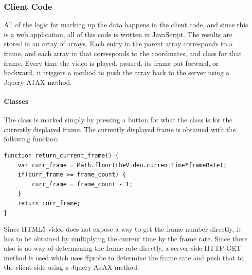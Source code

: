         \subsubsection{Client Code}
        All of the logic for marking up the data happens in the client code, and since this is a web application, all of this code is written in JavaScript. The results are stored in an array of arrays. Each entry in the parent array corresponds to a frame, and each array in that corresponds to the coordinates, and class for that frame. Every time the video is played, paused, its frame put forward, or backward, it triggers a method to push the array back to the server using a Jquery AJAX method.

            \paragraph{Classes}
            The class is marked simply by pressing a button for what the class is for the currently displayed frame. The currently displayed frame is obtained with the following function:
                \begin{lstlisting}[style=JSStyle]
function return_current_frame() {
    var curr_frame = Math.floor(theVideo.currentTime*frameRate);
    if(curr_frame >= frame_count) {
        curr_frame = frame_count - 1;
    }
    return curr_frame;
}
            \end{lstlisting} 
            Since HTML5 video does not expose a way to get the frame number directly, it has to be obtained by multiplying the current time by the frame rate. Since there also is no way of determening the frame rate directly, a server-side HTTP GET method is used which uses ffprobe to determine the frame rate and push that to the client side using a Jquery AJAX method.

